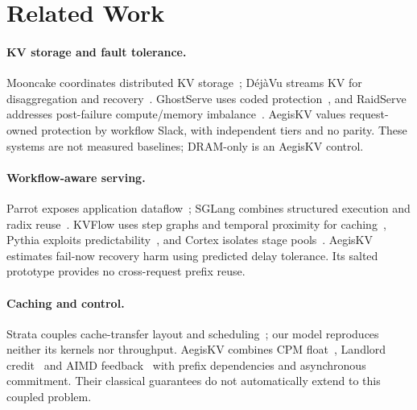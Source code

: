\section{Related Work}
\paragraph{KV storage and fault tolerance.}
Mooncake coordinates distributed KV storage~\cite{qin2025mooncake};
D\'ej\`aVu streams KV for disaggregation and recovery~\cite{strati2024dejavu}.
GhostServe uses coded protection~\cite{jayakody2026ghostserve}, and RaidServe
addresses post-failure compute/memory imbalance~\cite{xu2026raidserve}.
AegisKV values request-owned protection by workflow Slack, with independent
tiers and no parity. These systems are not measured baselines; DRAM-only
is an AegisKV control.

\paragraph{Workflow-aware serving.}
Parrot exposes application dataflow~\cite{lin2024parrot}; SGLang combines
structured execution and radix reuse~\cite{zheng2024sglang}. KVFlow uses
step graphs and temporal proximity for caching~\cite{pan2025kvflow},
Pythia exploits predictability~\cite{yu2026pythia}, and Cortex isolates
stage pools~\cite{pagonas2025cortex}. AegisKV estimates fail-now recovery
harm using predicted delay tolerance. Its salted prototype provides no
cross-request prefix reuse.

\paragraph{Caching and control.}
Strata couples cache-transfer layout and scheduling~\cite{xie2026strata};
our model reproduces neither its kernels nor throughput. AegisKV combines
CPM float~\cite{kelley1959cpm}, Landlord credit~\cite{young2002landlord} and
AIMD feedback~\cite{chiu1989aimd} with prefix dependencies and asynchronous
commitment. Their classical guarantees do not automatically extend to this
coupled problem.
